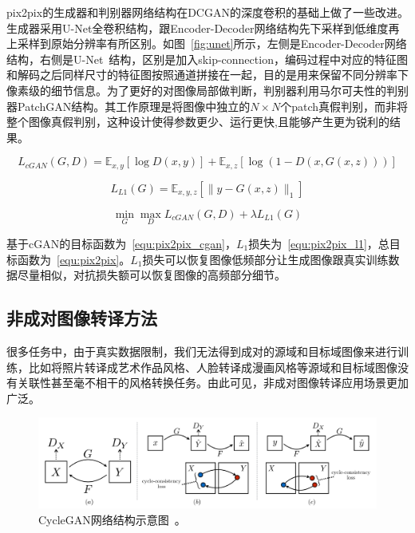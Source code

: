 pix2pix的生成器和判别器网络结构在DCGAN的深度卷积的基础上做了一些改进。生成器采用U-Net全卷积结构，跟Encoder-Decoder网络结构先下采样到低维度再上采样到原始分辨率有所区别。如图~\ref{fig:unet}所示，左侧是Encoder-Decoder网络结构，右侧是U-Net~\cite{ronneberger2015u}结构，区别是加入skip-connection，编码过程中对应的特征图和解码之后同样尺寸的特征图按照通道拼接在一起，目的是用来保留不同分辨率下像素级的细节信息。为了更好的对图像局部做判断，判别器利用马尔可夫性的判别器PatchGAN结构。其工作原理是将图像中独立的$N \times N$个patch真假判别，而非将整个图像真假判别，这种设计使得参数更少、运行更快,且能够产生更为锐利的结果。

\begin{equation}
\label{equ:pix2pix_cgan}
L_{cGAN}(G,D) = \mathbb{E}_{x,y}[\log D(x,y)] + \mathbb{E}_{x,z}[\log(1-D(x,G(x,z)))]
\end{equation}

\begin{equation}
\label{equ:pix2pix_l1}
L_{L1}(G) = \mathbb{E}_{x,y,z}[\parallel y-G(x,z) \parallel_1]
\end{equation}

\begin{equation}
\label{equ:pix2pix}
\min \limits_G \max \limits_D L_{cGAN}(G,D) + \lambda L_{L1}(G)
\end{equation}

基于cGAN的目标函数为~\ref{equ:pix2pix_cgan}，$L_1$损失为~\ref{equ:pix2pix_l1}，总目标函数为~\ref{equ:pix2pix}。$L_1$损失可以恢复图像低频部分让生成图像跟真实训练数据尽量相似，对抗损失额可以恢复图像的高频部分细节。


\subsection{非成对图像转译方法}
很多任务中，由于真实数据限制，我们无法得到成对的源域和目标域图像来进行训练，比如将照片转译成艺术作品风格、人脸转译成漫画风格等源域和目标域图像没有关联性甚至毫不相干的风格转换任务。由此可见，非成对图像转译应用场景更加广泛。

\begin{figure}[ht]
    \centering
	\includegraphics[width=\textwidth]{figs/cyclegan.pdf}
	\caption{CycleGAN网络结构示意图~\cite{zhu2017unpaired}。}
	\label{fig:cyclegan}
\end{figure}

